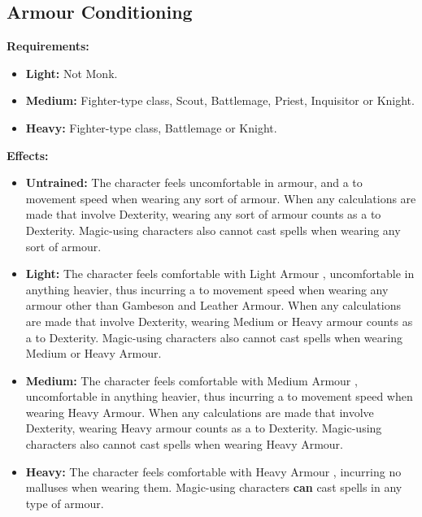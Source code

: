 \documentclass[openany,10pt,a4paper]{book}
\begin{document}
\subsection{Armour Conditioning}
\begin{table}[!ht]
\centering
{}
\end{table}
\textbf{Requirements:}
\begin{itemize}
	\item \textbf{Light:} Not Monk.
	\item \textbf{Medium:} Fighter-type class, Scout, Battlemage, Priest, Inquisitor or Knight.
	\item \textbf{Heavy:} Fighter-type class, Battlemage or Knight.
\end{itemize}
\textbf{Effects:}
\begin{itemize}
	\item \textbf{Untrained:} The character feels uncomfortable in armour, and a  to movement speed when wearing any sort of armour. When any calculations are made that involve Dexterity, wearing any sort of armour counts as a  to Dexterity. Magic-using characters also cannot cast spells when wearing any sort of armour.
	\item \textbf{Light:} The character feels comfortable with Light Armour , uncomfortable in anything heavier, thus incurring a  to movement speed when wearing any armour other than Gambeson and Leather Armour. When any calculations are made that involve Dexterity, wearing Medium or Heavy armour counts as a  to Dexterity. Magic-using characters also cannot cast spells when wearing Medium or Heavy Armour.
	\item \textbf{Medium:} The character feels comfortable with Medium Armour , uncomfortable in anything heavier, thus incurring a  to movement speed when wearing Heavy Armour. When any calculations are made that involve Dexterity, wearing Heavy armour counts as a  to Dexterity. Magic-using characters also cannot cast spells when wearing Heavy Armour.
	\item \textbf{Heavy:} The character feels comfortable with Heavy Armour , incurring no malluses when wearing them. Magic-using characters \textbf{can} cast spells in any type of armour.
\end{itemize}\newpage
\end{document}
